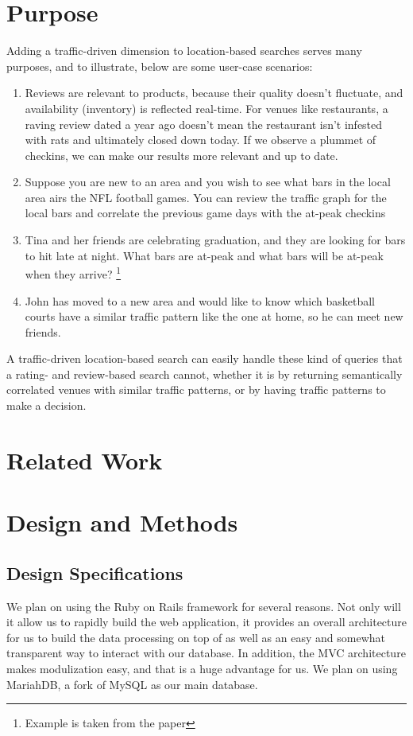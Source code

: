 \documentclass{article}
\begin{document}
\section{Purpose}
Adding a traffic-driven dimension to location-based searches serves many purposes, and to illustrate, below
are some user-case scenarios:
\begin{enumerate}
\item Reviews are relevant to products, because their quality doesn't fluctuate, and availability (inventory) is
reflected real-time. For venues like restaurants, a raving review dated a year ago doesn't mean the restaurant
isn't infested with rats and ultimately closed down today. If we observe a plummet of checkins, we can
make our results more relevant and up to date. 
\item Suppose you are new to an area and you wish to see what bars in the local area airs the NFL football games.
You can review the traffic graph for the local bars and correlate the previous game days with the at-peak checkins
\item Tina and her friends are celebrating graduation, and they are looking for bars to hit late at night. What bars
are at-peak and what bars will be at-peak when they arrive? \footnote{Example is taken from the paper}
\item John has moved to a new area and would like to know which basketball courts have a similar traffic pattern
like the one at home, so he can meet new friends. \footnotemark[\value{footnote}]
\end{enumerate}
A traffic-driven location-based search can easily handle these kind of queries that a rating- and review-based
search cannot, whether it is by returning semantically correlated venues with similar traffic patterns, or by
having traffic patterns to make a decision.

\section{Related Work}

\section{Design and Methods}
\subsection{Design Specifications}
We plan on using the Ruby on Rails framework for several reasons. Not only will it allow us
to rapidly build the web application, it provides an overall architecture for us to build the data processing
on top of as well as an easy and somewhat transparent way to interact with our database. In addition, the MVC
architecture makes modulization easy, and that is a huge advantage for us. We plan on using
MariahDB, a fork of MySQL as our main database.
\end{document}
